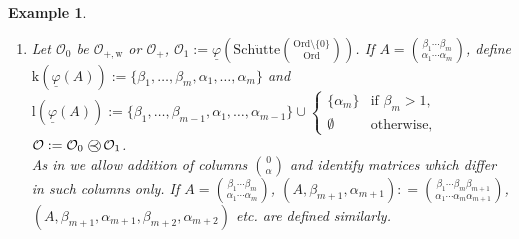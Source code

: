 \documentclass[10pt]{article}
\def \ssubitem#1{\item \label{\actlabel#1} }
\def\mycases#1{\begin{cases}#1\end{cases}}
\newtheorem {example}[lemma]{Example}
\def \calO{{\mathcal O}}
\def\k{\mathrm{k}}
\def\lrm{\mathrm{l}}
\def\phibar{{\underline{\varphi}}}
\def\schuette{\mathrm{Sch\ddot{u}tte}}
\def\wrm{\mathrm{w}}
\def\preccirc{\mathrel{\bigcirc \kern-12pt \prec}} %
\def\Ord{\mathrm{Ord}}
\begin{document}
\begin{example}
{\begin{enumerate}
and defining $\lrm(t):= \k(t)$ yields the fixed point free version
of the Veblen function.\par 
\ssubitem g Let $\calO_0$ be $\calO_{+,\wrm}$ or $\calO_+$,
$\calO_1:= \phibar(\schuette{\binom{\Ord  \setminus \{ 0 \}}{\Ord}})$.
If $A=  
{\binom{\beta_1 \cdots \beta_m}{\alpha_1 \cdots \alpha_m}}$,
define\\
$\k(\phibar(A)):= 
\{ \beta_1 ,\ldots, \beta_m,\alpha_1 ,\ldots, \alpha_m \}$ and\\
$\lrm(\phibar(A)):= 
\{ \beta_1 ,\ldots, \beta_{m-1},\alpha_1 ,\ldots, \alpha_{m-1}\} \cup 
\mycases{ \{ \alpha_m \} &\text{if $\beta_m>1$,}\\
\emptyset&\text{otherwise,}}$\\
$\calO:= \calO_0 \preccirc \calO_1$.\\
As in \cite{Schuette54} we allow addition of 
columns $\binom{0}{\alpha}$ and
identify matrices which differ in such columns only.
If $A= 
{\binom{\beta_1 \cdots \beta_m}{\alpha_1 \cdots \alpha_m}}$,
$(A,\beta_{m+1},\alpha_{m+1}):
= {\binom{\beta_1 \cdots \beta_m \beta_{m+1}}{
\alpha_1 \cdots \alpha_m \alpha_{m+1}}}$,\\
$(A,\beta_{m+1},\alpha_{m+1},\beta_{m+2},\alpha_{m+2})$
etc. are defined similarly.\\ 

\end{enumerate}}
\end{example}
\end{document}
